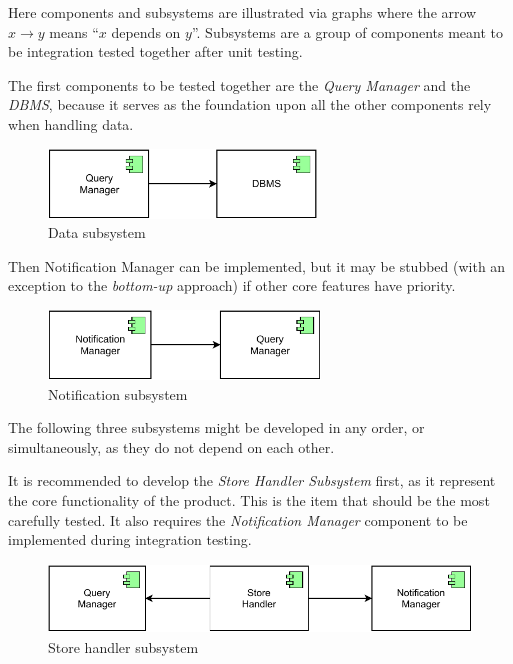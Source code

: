 Here components and subsystems are illustrated via graphs where the arrow $x \longrightarrow y$ means ``$x$ depends on $y$''. Subsystems are a group of components meant to be integration tested together after unit testing.

The first components to be tested together are the \emph{Query Manager} and the \emph{DBMS}, because it serves as the foundation upon all the other components rely when handling data.

\begin{figure}[H]
    \centering
    \includegraphics[height=5em]{images/draw.io/data_subsystem.pdf}
    \caption{Data subsystem}
    \label{fig:data_subsystem}
\end{figure}

Then Notification Manager can be implemented, but it may be stubbed (with an exception to the \emph{bottom-up} approach) if other core features have priority.

\begin{figure}[H]
    \centering
    \includegraphics[height=5em]{images/draw.io/notification_subsystem.pdf}
    \caption{Notification subsystem}
    \label{fig:notification_subsystem}
\end{figure}

The following three subsystems might be developed in any order, or simultaneously, as they do not depend on each other.

It is recommended to develop the \emph{Store Handler Subsystem} first, as it represent the core functionality of the product. This is the item that should be the most carefully tested. It also requires the \emph{Notification Manager} component to be implemented during integration testing.

\begin{figure}[H]
    \centering
    \includegraphics[height=5em]{images/draw.io/store_handler_subsystem.pdf}
    \caption{Store handler subsystem}
    \label{fig:store_handler_subsystem}
\end{figure}

